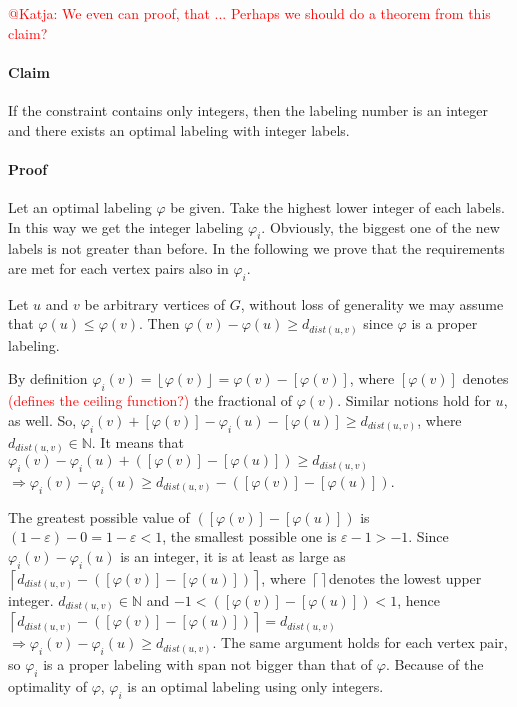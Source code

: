 \documentclass[smallextended]{svjour3}
\newcommand\ToDo[1]{\textcolor{red}{#1}}
\begin{document}
\ToDo{ @Katja: We even can proof, that ... Perhaps we should do a theorem from this claim?}
\paragraph{Claim}
If the constraint contains only integers, then the labeling number is an integer and there exists an optimal labeling with integer labels.

\paragraph{Proof}
Let an optimal labeling $\varphi$ be given. Take the highest lower integer of each labels. In this way we get the integer labeling $\varphi_{i}$. Obviously, the biggest one of the new labels is not greater than before. In the following we prove that the requirements are met for each vertex pairs also in $\varphi_{i}$. 

Let $u$ and $v$ be arbitrary vertices of $G$, without loss of generality we may assume that $\varphi(u)\leq\varphi(v)$. Then $\varphi(v)-\varphi(u)\geq d_{dist(u,v)}$ since $\varphi$ is a proper labeling. 

By definition $\varphi_{i}(v)=\left\lfloor \varphi(v)\right\rfloor =\varphi(v)-[\varphi(v)]$, where $[\varphi(v)]$ denotes \ToDo {(defines the ceiling function?)} the fractional of $\varphi(v)$. Similar notions hold for $u$, as well. So, $\varphi_{i}(v)+[\varphi(v)]-\varphi_{i}(u)-[\varphi(u)]\geq d_{dist(u,v)}$,
where $d_{dist(u,v)}\in\mathbb{N}$. It means that $\varphi_{i}(v)-\varphi_{i}(u)+([\varphi(v)]-[\varphi(u)])\geq d_{dist(u,v)}$
$\Rightarrow\varphi_{i}(v)-\varphi_{i}(u)\geq d_{dist(u,v)}-([\varphi(v)]-[\varphi(u)])$.


The greatest possible value of $([\varphi(v)]-[\varphi(u)])$ is $(1-\varepsilon)-0=1-\varepsilon<1$, the smallest possible one is $\varepsilon-1>-1$. Since $\varphi_{i}(v)-\varphi_{i}(u)$ is an integer, it is at least as large as $\left\lceil  d_{dist(u,v)}-([\varphi(v)]-[\varphi(u)])\right\rceil $, where $\left\lceil \right\rceil $denotes the lowest upper integer. $d_{dist(u,v)}\in\mathbb{N}$ and $-1<([\varphi(v)]-[\varphi(u)])<1$, hence $\left\lceil d_{dist(u,v)}-([\varphi(v)]-[\varphi(u)])\right\rceil =d_{dist(u,v)}$ 
$\Rightarrow\varphi_{i}(v)-\varphi_{i}(u)\geq d_{dist(u,v)}$. The same argument holds for each vertex pair, so $\varphi_{i}$ is a proper labeling with span not bigger than that of $\varphi$. Because of the optimality of $\varphi$, $\varphi_{i}$ is an optimal labeling using only integers.
\end{document}
